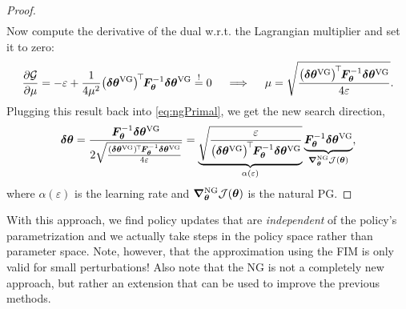\begin{proof}
\begin{align}
			\end{align}
			Now compute the derivative of the dual w.r.t. the Lagrangian multiplier and set it to zero:
			\begin{equation}
				\pdv{\mathcal{G}}{\mu} = -\varepsilon + \frac{1}{4 \mu^2} \bigl(\bm{\delta\theta}^\mathrm{VG}\bigr)^{\!\top\!} \bm{F}_{\bm{\theta}}^{-1} \bm{\delta\theta}^\mathrm{VG} \overset{!}{=} 0
				\quad\implies\quad
				\mu = \sqrt{\frac{\bigl(\bm{\delta\theta}^\mathrm{VG}\bigr)^{\!\top\!} \bm{F}_{\bm{\theta}}^{-1} \bm{\delta\theta}^\mathrm{VG}}{4 \varepsilon}}.
			\end{equation}
			Plugging this result back into \eqref{eq:ngPrimal}, we get the new search direction,
			\begin{equation}
				\bm{\delta\theta}
					= \frac{\bm{F}_{\bm{\theta}}^{-1} \bm{\delta\theta}^\mathrm{VG}}{2 \sqrt{\frac{(\bm{\delta\theta}^\mathrm{VG})^{\!\top\!} \bm{F}_{\bm{\theta}}^{-1} \bm{\delta\theta}^\mathrm{VG}}{4 \varepsilon}}}
					= \underbrace{\sqrt{\frac{\varepsilon}{\bigl(\bm{\delta\theta}^\mathrm{VG}\bigr)^{\!\top\!} \bm{F}_{\bm{\theta}}^{-1} \bm{\delta\theta}^\mathrm{VG}}}}_{\alpha(\varepsilon)} \underbrace{\bm{F}_{\bm{\theta}}^{-1} \bm{\delta\theta}^\mathrm{VG}}_{\grad_{\bm{\theta}}^\mathrm{NG} \mathcal{J}(\bm{\theta})},
			\end{equation}
			where \(\alpha(\varepsilon)\) is the learning rate and \( \grad_{\bm{\theta}}^\mathrm{NG} \mathcal{J}(\bm{\theta}) \) is the natural \ac{PG}.
		\end{proof}
		With this approach, we find policy updates that are \emph{independent} of the policy's parametrization and we actually take steps in the policy space rather than parameter space. Note, however, that the approximation using the \ac{FIM} is only valid for small perturbations! Also note that the \ac{NG} is not a completely new approach, but rather an extension that can be used to improve the previous methods.

